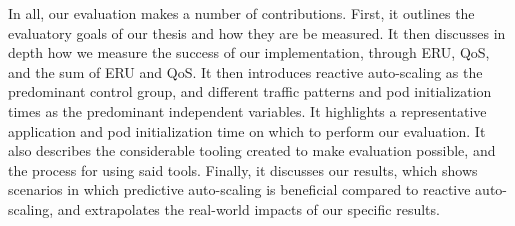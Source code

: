 In all, our evaluation makes a number of contributions. First, it outlines the
evaluatory goals of our thesis and how they are be measured. It then discusses
in depth how we measure the success of our implementation, through ERU,
QoS, and the sum of ERU and QoS. It then introduces reactive auto-scaling as the
predominant control group, and different traffic patterns and pod initialization
times as the predominant
independent variables. It highlights a representative application and pod
initialization time on which to perform our evaluation. It also describes the
considerable tooling created to make evaluation possible, and the process for
using said tools. Finally, it discusses our results, which shows scenarios in
which predictive auto-scaling is
beneficial compared to reactive auto-scaling, and extrapolates the real-world
impacts of our specific results.
